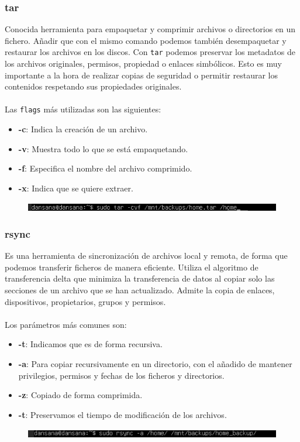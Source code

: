 \documentclass[10pt]{article}
\begin{document}
	\subsubsection{tar}
	Conocida herramienta para empaquetar y comprimir archivos o directorios en un fichero. Añadir que con el mismo comando podemos también desempaquetar y restaurar los archivos en los discos. Con \verb|tar| podemos preservar los metadatos de los archivos originales, permisos, propiedad o enlaces simbólicos. Esto es muy importante a la hora de realizar copias de seguridad o permitir restaurar los contenidos respetando sus propiedades originales.\\\\
	Las \verb|flags| más utilizadas son las siguientes:
	\begin{itemize}
		\item \textbf{-c}: Indica la creación de un archivo.
		\item \textbf{-v}: Muestra todo lo que se está empaquetando.
		\item \textbf{-f}: Especifica el nombre del archivo comprimido.
		\item \textbf{-x}: Indica que se quiere extraer. 
	\end{itemize}
	\begin{figure}[H]
		\setlength{\abovecaptionskip}{0cm}
		\setlength{\belowcaptionskip}{0cm}
		\centering
		\includegraphics[width=0.9\linewidth]{Recursos/tar.png}
	\end{figure}
	
	\subsubsection{rsync}
	Es una herramienta de sincronización de archivos local y remota, de forma que podemos transferir ficheros de manera eficiente. Utiliza el algoritmo de transferencia delta que minimiza la transferencia de datos al copiar solo las secciones de un archivo que se han actualizado. Admite la copia de enlaces, dispositivos, propietarios, grupos y permisos.\\\\
	Los parámetros más comunes son:
	\begin{itemize}
		\item \textbf{-t}: Indicamos que es de forma recursiva.
		\item \textbf{-a}: Para copiar recursivamente en un directorio, con el añadido de mantener privilegios, permisos y fechas de los ficheros y directorios.
		\item \textbf{-z}: Copiado de forma comprimida.
		\item \textbf{-t}: Preservamos el tiempo de modificación de los archivos.
	\end{itemize}
	\begin{figure}[H]
		\setlength{\abovecaptionskip}{0cm}
		\setlength{\belowcaptionskip}{0cm}
		\centering
		\includegraphics[width=0.9\linewidth]{Recursos/rsync.png}
	\end{figure}
	
	\clearpage
	
	
	
\end{document}
